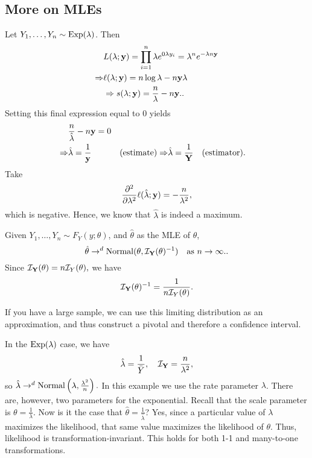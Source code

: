 \label{sec:wk18}

\subsection{More on MLEs}

\begin{eg}
Let $Y_1,\ldots, Y_n \sim \Exp(\lambda)$. Then 
\begin{align*}
		&L(\lambda;\yy)=\prod^n_{i=1}\lambda e^{0\lambda y_i} = \lambda^n e^{-\lambda n \yy} \\
		\implies &\ell(\lambda; \yy)=n\log \lambda -n\yy\lambda \\
				 &\implies s(\lambda;\yy)=\frac{n}{\lambda}-n\yy.
.\end{align*}
Setting this final expression equal to 0 yields
\begin{align*}
&\frac{n}{\hat{\lambda}}-n\yy=0 \\
		\implies&\hat{\lambda}=\frac{1}{\yy} \quad &\text{(estimate)}
		\implies &\hat{\lambda}=\frac{1}{\YY} \quad \text{(estimator).}
\end{align*}
Take $$\pder[{}^{2}]{\lambda^2}\ell(\hat{\lambda};\yy)=-\frac{n}{\lambda^2},$$ which is negative. Hence, we know that $\hat{\lambda}$ is indeed a maximum.
\end{eg}

\begin{remark}
Given $Y_1,\dots,Y_n\sim F_Y(y;\theta)$, and $\hat{\theta}$ as the MLE of $\theta$,
\[
		\hat{\theta}\to^d \Normal(\theta,\mathcal I_\YY(\theta)^{-1}) \quad \text{as }n\to \infty.
.\] Since $\mathcal I_\YY(\theta)=n\mathcal I_Y(\theta),$ we have
$$
\mathcal I_\YY(\theta)^{-1}=\frac{1}{n\mathcal I_Y(\theta)}.
$$
\end{remark}

If you have a large sample, we can use this limiting distribution as an approximation, and thus construct a pivotal and therefore a confidence interval.

\begin{eg}
		In the $\Exp(\lambda)$ case, we have
$$
\hat \lambda =\frac{1}{\bar Y}, \quad \mathcal I_\YY=\frac{n}{\lambda^2},
$$
so $\hat \lambda \to^d \Normal\left(\lambda, \frac{\lambda^2}{n}\right).$ In this example we use the rate parameter $\lambda$. There are, however, two parameters for the exponential. Recall that the scale parameter is $\theta=\frac{1}{\lambda}.$ Now is it the case that $\hat \theta =\frac{1}{\hat \lambda}$? Yes, since a particular value of $\lambda$ maximizes the likelihood, that same value maximizes the likelihood of $\theta$. Thus, likelihood is transformation-invariant. This holds for both 1-1 and many-to-one transformations.
\end{eg}


